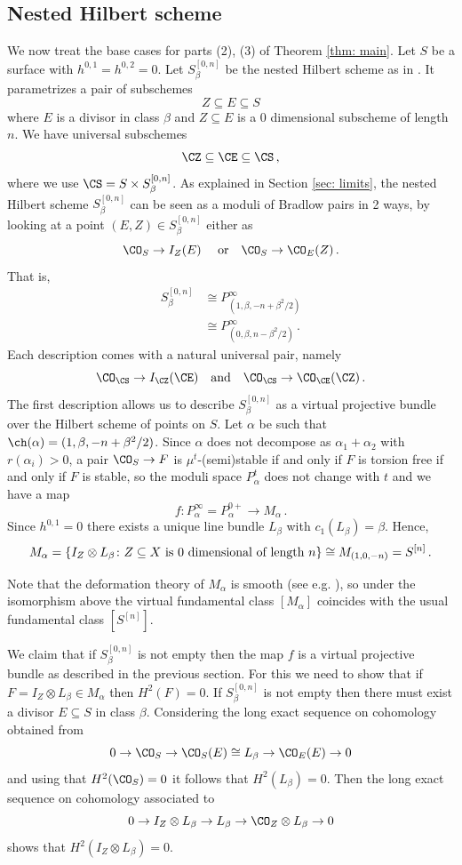 \subsection{Nested Hilbert scheme}
\label{sec: nestedhilbertscheme}
We now treat the base cases for parts (2), (3) of Theorem \ref{thm: main}. Let $S$ be a surface with $h^{0,1}=h^{0,2}=0$. Let $S_{\beta}^{[0,n]}$ be the nested Hilbert scheme as in \cite{gsy}. It parametrizes a pair of subschemes
\[Z\subseteq E\subseteq S\]
where $E$ is a divisor in class $\beta$ and $Z\subseteq E$ is a 0 dimensional subscheme of length~$n$.
We have universal subschemes
\[\CZ\subseteq \CE\subseteq\CS\,,\]
where we use $\CS=S\times S_\beta^{[0,n]}$. As explained in Section \ref{sec: limits}, the nested Hilbert scheme $S_{\beta}^{[0,n]}$ can be seen as a moduli of Bradlow pairs in 2 ways, by looking at a point $(E, Z)\in S_\beta^{[0,n]}$ either as
\[\CO_S\to I_Z(E)\quad\textup{ or}\quad\CO_S\to \CO_E(Z)\,.\]
That is,
\begin{align*}S_{\beta}^{[0,n]}&\cong P_{\left(1,\beta, -n+\beta^2/2\right)}^\infty\\
&\cong P_{\left(0,\beta, n-\beta^2/2\right)}^\infty\,.
\end{align*}
Each description comes with a natural universal pair, namely
\[\CO_{\CS}\to I_\CZ(\CE)\quad\textup{and}\quad\CO_{\CS}\to \CO_\CE(\CZ)\,.\]
The first description allows us to describe $S_\beta^{[0,n]}$ as a virtual projective bundle over the Hilbert scheme of points on $S$. Let $\alpha$ be such that $\ch(\alpha)=(1, \beta, -n+\beta^2/2)$. Since $\alpha$ does not decompose as $\alpha_1+\alpha_2$ with $r(\alpha_i)>0$, a pair $\CO_S\to F$ is $\mu^t$-(semi)stable if and only if $F$ is torsion free if and only if $F$ is stable, so the moduli space $P^t_\alpha$ does not change with $t$ and we have a map
\[f\colon P_\alpha^\infty=P_\alpha^{0+}\to M_\alpha\,.\]
Since $h^{0,1}=0$ there exists a unique line bundle $L_\beta$ with $c_1(L_\beta)=\beta$. Hence,
\[M_\alpha=\{I_Z\otimes L_\beta\colon Z\subseteq X\textup{ is }0\textup{ dimensional of length }n\}\cong M_{(1,0,-n)}=S^{[n]}\,.\]

Note that the deformation theory of $M_{\alpha}$ is smooth (see e.g. \cite[Proposition 2.2]{EGL}), so under the isomorphism above the virtual fundamental class $[M_\alpha]$ coincides with the usual fundamental class $[S^{[n]}]$.

We claim that if $S_{\beta}^{[0,n]}$ is not empty then the map $f$ is a virtual projective bundle as described in the previous section. For this we need to show that if $F=I_Z\otimes L_\beta\in M_\alpha$ then $H^2(F)=0$. If $S_{\beta}^{[0,n]}$ is not empty then there must exist a divisor $E\subseteq S$ in class $\beta$. Considering the long exact sequence on cohomology obtained from
\[0\to \CO_S\to \CO_S(E)\cong L_\beta\to \CO_E(E)\to 0\]
and using that $H^2(\CO_S)=0$ it follows that $H^2(L_\beta)=0$. Then the long exact sequence on cohomology associated to
\[0\to I_Z\otimes L_\beta\to L_\beta\to \CO_Z\otimes L_\beta\to 0\]
shows that $H^2(I_Z\otimes L_\beta)=0$.


